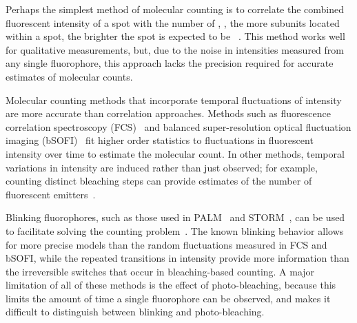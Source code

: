 %
%


%
Perhaps the simplest method of molecular counting is to correlate the combined
fluorescent intensity of a spot with the number of \smallobjects, \ie, the more subunits 
located within a spot, the brighter the spot is expected to be ~\citep{schmied_2012,
tolar_2005}.
  This method works well for qualitative measurements, but, due to the noise in
  intensities measured from any single fluorophore, this approach lacks the precision 
  required for accurate estimates of molecular counts. 

%
Molecular counting methods that incorporate temporal fluctuations of intensity
are more accurate than correlation approaches.
  Methods such as fluorescence correlation spectroscopy
  (FCS)~\citep{otsuka_2023,wachsmuth_2015,politi_2018} and balanced
  super-resolution optical fluctuation imaging
  (bSOFI)~\citep{geissbuehler_2012} fit higher order statistics to fluctuations
  in fluorescent intensity over time to estimate the molecular count.
  In other methods, temporal variations in intensity are induced rather than
  just observed; for example, counting distinct bleaching
  steps can provide estimates of the number of fluorescent
  emitters~\citep{ulbrich_2007,jain_2011,hummert_2021, garry_bayesian_2020}.

%
Blinking fluorophores, such as those used in
PALM~\citep{sengupta_pcPALM_2011,lee_counting_2012} and
STORM~\citep{patel_blinking_2021}, can be used to facilitate solving the counting
problem~\citep{rollins_stochastic_2015,nino_2017}.
  The known blinking behavior allows for more precise models than the random
  fluctuations measured in FCS and bSOFI, while the repeated transitions in
  intensity provide more information than the irreversible switches that occur 
  in bleaching-based counting.
  A major limitation of all of these methods is the effect of photo-bleaching, because this
  limits the amount of time a single fluorophore can be observed, and makes it
  difficult to distinguish between blinking and photo-bleaching.

